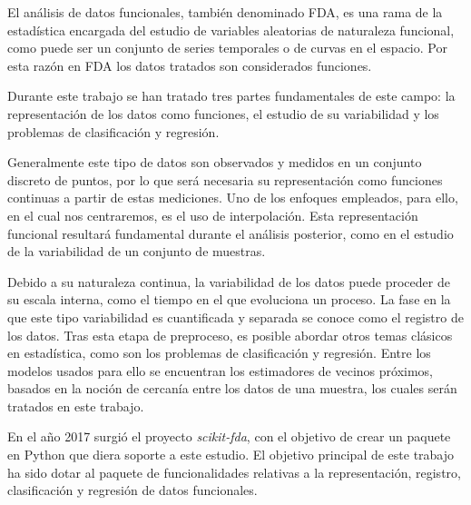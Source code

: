 El análisis de datos funcionales, también denominado FDA, es una rama de la
estadística encargada del estudio de variables aleatorias de naturaleza
funcional, como puede ser un conjunto de series temporales o de curvas en el
espacio. Por esta razón en FDA los datos tratados son considerados funciones.

Durante este trabajo se han tratado tres partes fundamentales de este campo:
la representación de los datos como funciones, el estudio de su variabilidad
y los problemas de clasificación y regresión.

Generalmente este tipo de datos son observados y medidos en un conjunto
discreto de puntos, por lo que será necesaria su representación como
funciones continuas a partir de estas mediciones.
Uno de los enfoques empleados, para ello, en el cual nos centraremos, es el uso de interpolación.
Esta representación funcional resultará fundamental durante el análisis posterior,
como en el estudio de la variabilidad de un conjunto de muestras.

Debido a su naturaleza continua, la variabilidad de los datos
puede proceder de su escala interna, como el tiempo en el que evoluciona un
proceso. La fase en la que este tipo variabilidad es cuantificada y separada se
conoce como el registro de los datos. Tras esta etapa de preproceso, es posible
abordar otros temas clásicos en estadística, como son los problemas de
clasificación y regresión. Entre los modelos usados para ello se encuentran los
estimadores de vecinos próximos, basados en la noción de cercanía entre los
datos de una muestra, los cuales serán tratados en este trabajo.

En el año 2017 surgió el proyecto \textit{scikit-fda}, con el objetivo de crear
un paquete en Python que diera soporte a este estudio. El objetivo principal
de este trabajo ha sido dotar al paquete de funcionalidades relativas a la
representación, registro, clasificación y regresión de datos funcionales.



